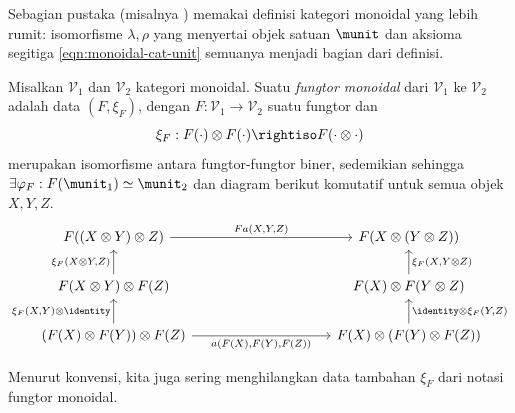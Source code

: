 \begin{remark}
	Sebagian pustaka (misalnya \cite{ML98}) memakai definisi kategori monoidal yang lebih rumit: isomorfisme $\lambda, \rho$ yang menyertai objek satuan $\munit$ dan aksioma segitiga \eqref{eqn:monoidal-cat-unit} semuanya menjadi bagian dari definisi.
\end{remark}

\begin{definition}\label{def:monoidal-functor}
	Misalkan $\mathcal{V}_1$ dan $\mathcal{V}_2$ kategori monoidal. Suatu \emph{fungtor monoidal} dari $\mathcal{V}_1$ ke $\mathcal{V}_2$ adalah data $(F, \xi_F)$, dengan $F: \mathcal{V}_1 \to \mathcal{V}_2$ suatu fungtor dan
	\[ \xi_F:  F(\cdot) \otimes F(\cdot) \rightiso F(\cdot \otimes \cdot) \]
	merupakan isomorfisme antara fungtor-fungtor biner, sedemikian sehingga $\exists \varphi_F: F(\munit_1) \simeq \munit_2$ dan diagram berikut komutatif untuk semua objek $X,Y,Z$.
	\[ \begin{tikzcd}[column sep=10em]
		F((X \otimes Y) \otimes Z) \arrow[r, "{F a(X,Y,Z)}"] & F(X \otimes (Y \otimes Z)) \\
		F(X \otimes Y) \otimes F(Z) \arrow[u, "{\xi_F(X \otimes Y, Z)}"] & F(X) \otimes F(Y \otimes Z) \arrow[u, "{\xi_F(X, Y \otimes Z)}"'] \\
		(F(X) \otimes F(Y)) \otimes F(Z) \arrow[r, "{a(F(X), F(Y), F(Z))}"'] \arrow[u, "{\xi_F(X, Y) \otimes \identity}"] & F(X) \otimes (F(Y) \otimes F(Z)) \arrow[u, "{\identity \otimes \xi_F(Y, Z)}"']
	\end{tikzcd} \]
\end{definition}
Menurut konvensi, kita juga sering menghilangkan data tambahan $\xi_F$ dari notasi fungtor monoidal.

